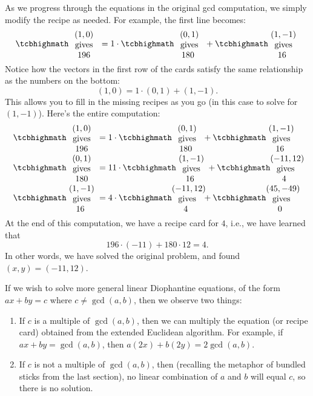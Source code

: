 \documentclass{article}
\theoremstyle{plain}
\theoremstyle{definition}
\theoremstyle{remark}
\numberwithin{theorem}{section}
\begin{document}
As we progress through the equations in the original gcd computation, we simply modify the recipe as needed.  For example, the first line becomes:
\[
      \card{ $(1,0)$ \\ gives \\ $196$} = 1  \cdot \card{ $(0,1)$ \\ gives \\ $180$ } + \card{ $(1,-1)$ \\ gives \\ $16$ } 
\]
Notice how the vectors in the first row of the cards satisfy the same relationship as the numbers on the bottom:
\[
	(1,0) = 1 \cdot (0,1) + (1,-1).
\]
This allows you to fill in the missing recipes as you go (in this case to solve for $(1,-1)$).  Here's the entire computation:
    \begin{align*}
      \card{ $(1,0)$ \\ gives \\ $196$} &= 1  \cdot \card{ $(0,1)$ \\ gives \\ $180$ } + \card{ $(1,-1)$ \\ gives \\ $16$ } \\
      \card{ $(0,1)$ \\ gives \\ $180$} &= 11  \cdot \card{ $(1,-1)$ \\ gives \\ $16$ } + \card{ $(-11,12)$ \\ gives \\ $4$ } \\
     \card{ $(1,-1)$ \\ gives \\ $16$ } &= 4  \cdot\card{ $(-11,12)$ \\ gives \\ $4$ } + \card{ $(45,-49)$ \\ gives \\ $0$ } 
    \end{align*}
At the end of this computation, we have a recipe card for $4$, i.e., we have learned that
\[
	196 \cdot (-11) + 180 \cdot 12 = 4.
\]
In other words, we have solved the original problem, and found $(x,y) = (-11,12)$. 


If we wish to solve more general linear Diophantine equations, of the form $ax + by = c$ where $c \neq \gcd(a,b)$, then we observe two things:
\begin{enumerate}
	\item If $c$ is a multiple of $\gcd(a,b)$, then we can multiply the equation (or recipe card) obtained from the extended Euclidean algorithm.  For example, if $ax + by = \gcd(a,b)$, then $a(2x) + b(2y) = 2\gcd(a,b)$.
	\item If $c$ is not a multiple of $\gcd(a,b)$, then (recalling the metaphor of bundled sticks from the last section), no linear combination of $a$ and $b$ will equal $c$, so there is no solution.
\end{enumerate}
\end{document}
